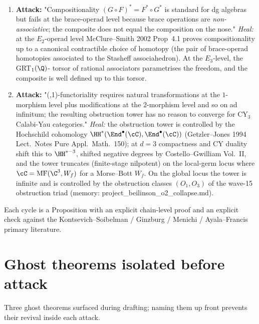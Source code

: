 \begin{enumerate}
\item[(R5)] \textbf{Attack:} "Compositionality $(G\circ F)^* = F^* \circ G^*$
     is standard for dg algebras but fails at the brace-operad level
     because brace operations are \emph{non-associative}; the
     composite does not equal the composition on the nose."
     \emph{Heal:} at the $E_2$-operad level McClure--Smith 2002 Prop~4.1
     proves compositionality up to a canonical contractible choice of
     homotopy (the pair of brace-operad homotopies associated to the
     Stasheff associahedron).  At the $E_3$-level, the GRT$_1(\Q)$-
     torsor of rational associators parametrises the freedom, and the
     composite is well defined up to this torsor.
\item[(R6)] \textbf{Attack:} "(\infty,1)-functoriality requires
     natural transformations at the $1$-morphism level plus
     modifications at the $2$-morphism level and so on ad infinitum;
     the resulting obstruction tower has no reason to converge for
     CY$_3$ Calabi-Yau categories."  \emph{Heal:} the obstruction
     tower is controlled by the Hochschild cohomology
     $\HH^{*}(\End^\bullet(\cC), \End^\bullet(\cC))$ (Getzler--Jones
     1994 Lect.\ Notes Pure Appl.\ Math.\ 150); at $d = 3$ compactness
     and CY duality shift this to $\HH^{*-3}$, shifted negative degrees
     by Costello--Gwilliam Vol.~II, and the tower truncates
     (finite-stage nilpotent) on the local-germ locus where
     $\cC = \mathrm{MF}(\C^3, W_f)$ for a Morse--Bott $W_f$.  On the
     global locus the tower is infinite and is controlled by the
     obstruction classes $(O_1, O_3)$ of the wave-15 obstruction
     triad (memory: project\_beilinson\_o2\_collapse.md).
\end{enumerate}

Each cycle is a Proposition with an explicit chain-level proof and an
explicit check against the Kontsevich--Soibelman / Ginzburg / Menichi /
Ayala--Francis primary literature.

\section*{Ghost theorems isolated before attack}

Three ghost theorems surfaced during drafting; naming them up front
prevents their revival inside each attack.

